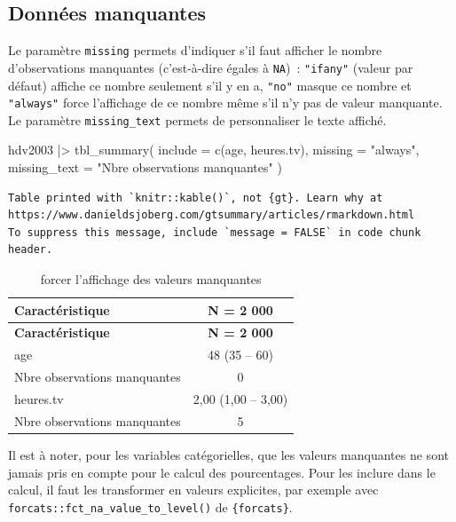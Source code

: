 \documentclass[
  letterpaper,
  DIV=11,
  numbers=noendperiod,
  oneside]{scrreprt}
\newenvironment{Shaded}{\begin{snugshade}}{\end{snugshade}}
\newcommand{\AttributeTok}[1]{\textcolor[rgb]{0.40,0.45,0.13}{#1}}
\newcommand{\FunctionTok}[1]{\textcolor[rgb]{0.28,0.35,0.67}{#1}}
\newcommand{\NormalTok}[1]{\textcolor[rgb]{0.00,0.23,0.31}{#1}}
\newcommand{\SpecialCharTok}[1]{\textcolor[rgb]{0.37,0.37,0.37}{#1}}
\newcommand{\StringTok}[1]{\textcolor[rgb]{0.13,0.47,0.30}{#1}}
\begin{document}
\hypertarget{donnuxe9es-manquantes}{%
\subsection{Données manquantes}\label{donnuxe9es-manquantes}}

Le paramètre \texttt{missing} permets d'indiquer s'il faut afficher le
nombre d'observations manquantes (c'est-à-dire égales à \texttt{NA})~:
\texttt{"ifany"} (valeur par défaut) affiche ce nombre seulement s'il y
en a, \texttt{"no"} masque ce nombre et \texttt{"always"} force
l'affichage de ce nombre même s'il n'y pas de valeur manquante. Le
paramètre \texttt{missing\_text} permets de personnaliser le texte
affiché.

\begin{Shaded}
\begin{Highlighting}[]
\NormalTok{hdv2003 }\SpecialCharTok{|\textgreater{}}
  \FunctionTok{tbl\_summary}\NormalTok{(}
    \AttributeTok{include =} \FunctionTok{c}\NormalTok{(age, heures.tv),}
    \AttributeTok{missing =} \StringTok{"always"}\NormalTok{,}
    \AttributeTok{missing\_text =} \StringTok{"Nbre observations manquantes"}
\NormalTok{  )}
\end{Highlighting}
\end{Shaded}

\begin{verbatim}
Table printed with `knitr::kable()`, not {gt}. Learn why at
https://www.danieldsjoberg.com/gtsummary/articles/rmarkdown.html
To suppress this message, include `message = FALSE` in code chunk header.
\end{verbatim}

\hypertarget{tbl-missing}{}
\begin{longtable}[]{@{}lc@{}}
\caption{\label{tbl-missing}forcer l'affichage des valeurs
manquantes}\tabularnewline
\toprule()
\textbf{Caractéristique} & \textbf{N = 2 000} \\
\midrule()
\endfirsthead
\toprule()
\textbf{Caractéristique} & \textbf{N = 2 000} \\
\midrule()
\endhead
age & 48 (35 -- 60) \\
Nbre observations manquantes & 0 \\
heures.tv & 2,00 (1,00 -- 3,00) \\
Nbre observations manquantes & 5 \\
\bottomrule()
\end{longtable}

Il est à noter, pour les variables catégorielles, que les valeurs
manquantes ne sont jamais pris en compte pour le calcul des
pourcentages. Pour les inclure dans le calcul, il faut les transformer
en valeurs explicites, par exemple avec
\texttt{forcats::fct\_na\_value\_to\_level()} de \texttt{\{forcats\}}.
\end{document}
